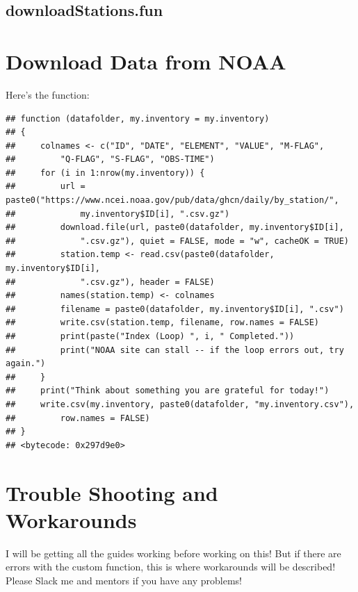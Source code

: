 \documentclass{article}\usepackage[]{graphicx}\usepackage[dvipsnames]{xcolor}
\makeatletter
\newenvironment{kframe}{%
 \def\at@end@of@kframe{}%
 \ifinner\ifhmode%
  \def\at@end@of@kframe{\end{minipage}}%
  \begin{minipage}{\columnwidth}%
 \fi\fi%
 \def\FrameCommand##1{\hskip\@totalleftmargin \hskip-\fboxsep
 \colorbox{shadecolor}{##1}\hskip-\fboxsep
     \hskip-\linewidth \hskip-\@totalleftmargin \hskip\columnwidth}%
 \MakeFramed {\advance\hsize-\width
   \@totalleftmargin\z@ \linewidth\hsize
   \@setminipage}}%
 {\par\unskip\endMakeFramed%
 \at@end@of@kframe}
\newenvironment{knitrout}{}{} %
\makeatother
\begin{document}
\subsection{downloadStations.fun}\label{subsec:downloadStations}\section{Download Data from NOAA}





Here's the function:

\begin{knitrout}
\color{fgcolor}\begin{kframe}
\begin{verbatim}
## function (datafolder, my.inventory = my.inventory) 
## {
##     colnames <- c("ID", "DATE", "ELEMENT", "VALUE", "M-FLAG", 
##         "Q-FLAG", "S-FLAG", "OBS-TIME")
##     for (i in 1:nrow(my.inventory)) {
##         url = paste0("https://www.ncei.noaa.gov/pub/data/ghcn/daily/by_station/", 
##             my.inventory$ID[i], ".csv.gz")
##         download.file(url, paste0(datafolder, my.inventory$ID[i], 
##             ".csv.gz"), quiet = FALSE, mode = "w", cacheOK = TRUE)
##         station.temp <- read.csv(paste0(datafolder, my.inventory$ID[i], 
##             ".csv.gz"), header = FALSE)
##         names(station.temp) <- colnames
##         filename = paste0(datafolder, my.inventory$ID[i], ".csv")
##         write.csv(station.temp, filename, row.names = FALSE)
##         print(paste("Index (Loop) ", i, " Completed."))
##         print("NOAA site can stall -- if the loop errors out, try again.")
##     }
##     print("Think about something you are grateful for today!")
##     write.csv(my.inventory, paste0(datafolder, "my.inventory.csv"), 
##         row.names = FALSE)
## }
## <bytecode: 0x297d9e0>
\end{verbatim}
\end{kframe}
\end{knitrout}

\section{Trouble Shooting and Workarounds}

I will be getting all the guides working before working on this! But if there are errors with the custom function, this is where workarounds will be described! Please Slack me and mentors if you have any problems!
\end{document}
